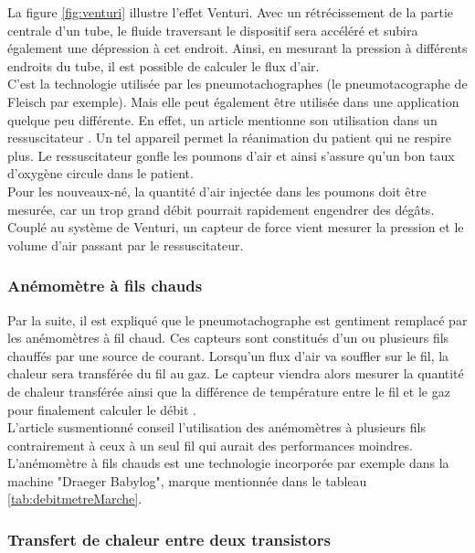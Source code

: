 La figure \ref{fig:venturi} illustre l'effet Venturi. Avec un rétrécissement de la partie centrale d'un tube, le fluide traversant le dispositif 
sera accéléré et subira également une dépression à cet endroit. Ainsi, en mesurant la pression à différents endroits du tube, il est possible 
de calculer le flux d'air. \\

C'est la technologie utilisée par les pneumotachographes (le pneumotacographe de Fleisch par exemple). Mais elle peut également être utilisée 
dans une application quelque peu différente. En effet, un article mentionne son utilisation dans un ressuscitateur \cite{jacq_ultra-low_2011}. 
Un tel appareil permet la réanimation du patient qui ne respire plus. Le ressuscitateur gonfle les poumons d'air et ainsi s'assure qu'un bon 
taux d'oxygène circule dans le patient. \\
Pour les nouveaux-né, la quantité d'air injectée dans les poumons doit être mesurée, car un trop grand débit pourrait rapidement engendrer 
des dégâts. \\
Couplé au système de Venturi, un capteur de force vient mesurer la pression et le volume d'air passant par le ressuscitateur. 

\subsubsection{Anémomètre à fils chauds}
Par la suite, il est expliqué que le pneumotachographe est gentiment remplacé par les anémomètres à fil chaud. Ces capteurs sont 
constitués d'un ou plusieurs fils chauffés par une source de courant. Lorsqu'un flux d'air va souffler sur le fil, la chaleur sera 
transférée du fil au gaz. Le capteur viendra alors mesurer la quantité de chaleur transférée ainsi que la différence de température entre 
le fil et le gaz pour finalement calculer le débit \cite{oberg_biomedical_2011}. \\
L'article susmentionné conseil l'utilisation des anémomètres à plusieurs fils contrairement à ceux à un seul fil qui aurait des performances 
moindres. 
L'anémomètre à fils chauds est une technologie incorporée par exemple dans la machine "Draeger Babylog", marque mentionnée dans le tableau \ref{tab:debitmetreMarche}. 

\subsubsection{Transfert de chaleur entre deux transistors}

